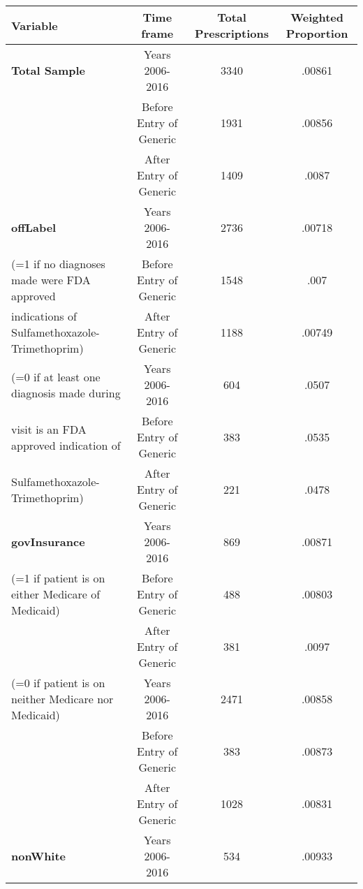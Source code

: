 \begin{tabular}{l*{3}{c}}
\hline\hline
            Variable&\multicolumn{1}{c}{Time frame}&\multicolumn{1}{c}{Total Prescriptions}&\multicolumn{1}{c}{Weighted Proportion}\\
\hline
\textbf{Total Sample}                                   &     Years 2006-2016&                          3340&     .00861\\
                                                        &     Before Entry of Generic&    1931&     .00856\\
                                                        &     After Entry of Generic&      1409&     .0087\\
[1em]
\textbf{offLabel}                                       &     Years 2006-2016&             2736&     .00718\\
(=1 if no diagnoses made were FDA approved         &     Before Entry of Generic&    1548&     .007\\
indications of Sulfamethoxazole-Trimethoprim)  &     After Entry of Generic&      1188&     .00749\\
[.5em]
(=0 if at least one diagnosis made during               &     Years 2006-2016&             604&     .0507\\
visit is an FDA approved indication of                  &     Before Entry of Generic&    383&     .0535\\
Sulfamethoxazole-Trimethoprim)                          &     After Entry of Generic&      221&     .0478\\
[.5em]
\textbf{govInsurance}                                   &     Years 2006-2016&             869&     .00871\\
(=1 if patient is on either Medicare of Medicaid)       &     Before Entry of Generic&     488 &     .00803\\
                                                        &     After Entry of Generic&      381 &     .0097\\
[.5em]
(=0 if patient is on neither Medicare nor Medicaid)     &     Years 2006-2016&             2471&     .00858\\
                                                        &     Before Entry of Generic&     383 &     .00873\\
                                                        &     After Entry of Generic&      1028 &     .00831\\
[.5em]
\textbf{nonWhite}                                       &     Years 2006-2016&             534&      .00933\\

\end{tabular}
